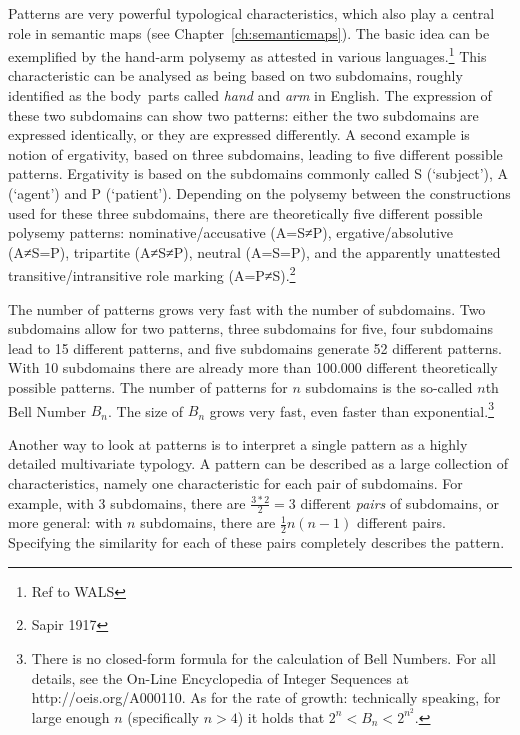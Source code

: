 %
Patterns are very powerful typological characteristics, which also play a central role in semantic maps (see Chapter~\ref{ch:semanticmaps}). The basic idea can be exemplified by the hand-arm polysemy as attested in various languages.\footnote{Ref to WALS} This characteristic can be analysed as being based on two subdomains, roughly identified as the body~parts called \textit{hand} and \textit{arm} in English. The expression of these two subdomains can show two patterns: either the two subdomains are expressed identically, or they are expressed differently. A second example is notion of ergativity, based on three subdomains, leading to five different possible patterns. Ergativity is based on the subdomains commonly called S (`subject'), A (`agent') and P (`patient'). Depending on the polysemy between the  constructions used for these three subdomains, there are theoretically five different possible polysemy patterns: nominative/accusative (A=S≠P), ergative/absolutive (A≠S=P), tripartite (A≠S≠P), neutral (A=S=P), and the apparently unattested transitive/intransitive role marking (A=P≠S).\footnote{Sapir 1917}

The number of patterns grows very fast with the number of subdomains. Two subdomains allow for two patterns, three subdomains for five, four subdomains lead to 15 different patterns, and five subdomains generate 52 different patterns. With 10 subdomains there are already more than 100.000 different theoretically possible patterns. The number of patterns for $n$ subdomains is the so-called $n$th Bell Number $B_{n}$. The size of $B_{n}$ grows very fast, even faster than exponential.\footnote{There is no closed-form formula for the calculation of Bell Numbers. For all details, see the On-Line Encyclopedia of Integer Sequences at http://oeis.org/A000110. As for the rate of growth: technically speaking, for large enough $n$ (specifically $n>4$) it holds that $2^n < B_{n} < 2^{n^2}$.}

Another way to look at patterns is to interpret a single pattern as a highly detailed multivariate typology. A pattern can be described as a large collection of characteristics, namely one characteristic for each pair of subdomains. For example, with 3 subdomains, there are $\frac{3*2}{2} = 3$ different \emph{pairs} of subdomains, or more general: with $n$ subdomains, there are $\frac{1}{2}n(n-1)$ different pairs. Specifying the similarity for each of these pairs completely describes the pattern. 

